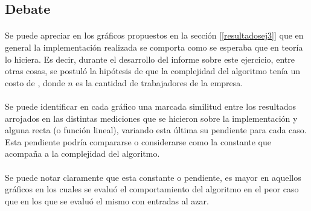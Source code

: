 \subsection{Debate}
\paragraph{}
Se puede apreciar en los gráficos propuestos en la sección [\ref{resultadosej3}] que en general la implementación realizada se comporta como se esperaba que en teoría lo hiciera. Es decir, durante el desarrollo del informe sobre este ejercicio, entre otras cosas, se postuló la hipótesis de que la complejidad del algoritmo tenía un costo de , donde $n$ es la cantidad de trabajadores de la empresa.

\paragraph{}
Se puede identificar en cada gráfico una marcada similitud entre los resultados arrojados en las distintas mediciones que se hicieron sobre la implementación y alguna recta (o función lineal), variando esta última su pendiente para cada caso. Esta pendiente podría compararse o considerarse como la constante que acompa\~na a la complejidad del algoritmo.

\paragraph{}
Se puede notar claramente que esta constante o pendiente, es mayor en aquellos gráficos en los cuales se evaluó el comportamiento del algoritmo en el peor caso que en los que se evaluó el mismo con entradas al azar.

